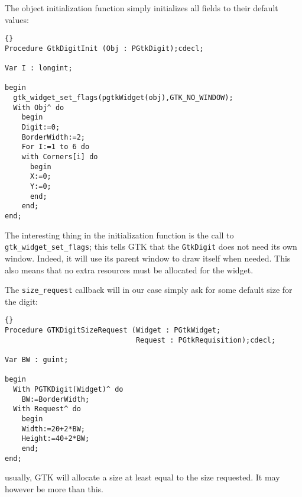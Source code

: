 \documentclass[10pt]{article}
\begin{document}
The object initialization function \lstinline|| simply initializes all fields to their
default values:
\begin{lstlisting}{}
Procedure GtkDigitInit (Obj : PGtkDigit);cdecl;

Var I : longint;

begin
  gtk_widget_set_flags(pgtkWidget(obj),GTK_NO_WINDOW);
  With Obj^ do
    begin 
    Digit:=0;
    BorderWidth:=2;
    For I:=1 to 6 do
    with Corners[i] do
      begin
      X:=0;
      Y:=0;
      end;
    end;  
end;
\end{lstlisting}
The interesting thing in the initialization function is the call to
\lstinline|gtk_widget_set_flags|; this tells GTK that the
\lstinline|GtkDigit| does not need its own window. Indeed, it will
use its parent window to draw itself when needed.
This also means that no extra resources must be allocated for the widget.

The \lstinline|size_request| callback will in our case simply ask for some
default size for the digit:
\begin{lstlisting}{}
Procedure GTKDigitSizeRequest (Widget : PGtkWidget; 
                               Request : PGtkRequisition);cdecl;
   
Var BW : guint;   
                               
begin
  With PGTKDigit(Widget)^ do
    BW:=BorderWidth;
  With Request^ do
    begin
    Width:=20+2*BW;
    Height:=40+2*BW;
    end;
end;
\end{lstlisting}
usually, GTK will allocate a size at least equal to the size requested. It
may however be more than this.
\end{document}
